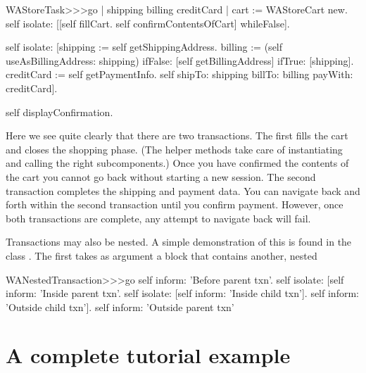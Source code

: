 \documentclass[a4paper,10pt,twoside]{book}
\begin{document}
\begin{code}{}
WAStoreTask>>>go
	| shipping billing creditCard |
	cart := WAStoreCart new.
	self isolate:
		[[self fillCart.
		self confirmContentsOfCart]
			whileFalse].

	self isolate:
		[shipping := self getShippingAddress.
		billing := (self useAsBillingAddress: shipping)
					ifFalse: [self getBillingAddress]
					ifTrue: [shipping].
		creditCard := self getPaymentInfo.
		self shipTo: shipping billTo: billing payWith: creditCard].

	self displayConfirmation.
\end{code}

Here we see quite clearly that there are two transactions.
The first fills the cart and closes the shopping phase.
(The helper methods  \etc take care of instantiating and calling the right
subcomponents.)
Once you have confirmed the contents of the cart you cannot go back without starting a
new session.
The second transaction completes the shipping and payment data.
You can navigate back and forth within the second transaction until you confirm payment.
However, once both transactions are complete, any attempt to navigate back will fail.

Transactions may also be nested.
A simple demonstration of this is found in the class .
The first  takes as argument a block that contains another, nested

\begin{code}{}
WANestedTransaction>>>go
	self inform: 'Before parent txn'.
	self isolate:
			[self inform: 'Inside parent txn'.
			self isolate: [self inform: 'Inside child txn'].
			self inform: 'Outside child txn'].
	self inform: 'Outside parent txn'
\end{code}


\section{A complete tutorial example}
\end{document}
